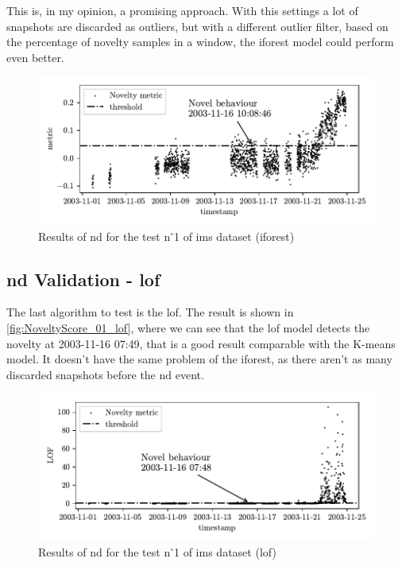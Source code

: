 This is, in my opinion, a promising approach. With this settings a lot of snapshots are discarded as outliers, but with a different outlier filter, based on the percentage of novelty samples in a window, the \gls{iforest} model could perform even better.
\begin{figure}
    \centering
    \includegraphics{images/IMS/Novelty_01_500samples_bearing3x_iforest.pdf}
    \caption{Results of \gls{nd} for the test $\text{n}^\circ$1 of \gls{ims} dataset (\gls{iforest})}
    \label{fig:NoveltyScore_01_iforest}
\end{figure}

\subsection{\gls{nd} Validation - \gls{lof}}
The last algorithm to test is the \gls{lof}. The result is shown in \autoref{fig:NoveltyScore_01_lof}, where we can see that the \gls{lof} model detects the novelty at 2003-11-16 07:49, that is a good result comparable with the K-means model. It doesn't have the same problem of the \gls{iforest}, as there aren't as many discarded snapshots before the \gls{nd} event.

\begin{figure}
    \centering
    \includegraphics{images/IMS/Novelty_01_500samples_bearing3x_lof.pdf}
    \caption{Results of \gls{nd} for the test $\text{n}^\circ$1 of \gls{ims} dataset (\gls{lof})}
    \label{fig:NoveltyScore_01_lof}
\end{figure}

